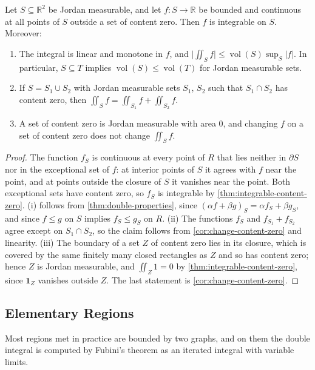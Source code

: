 \begin{theorem}
\label{thm:integral-over-region}
Let $S\subseteq\mathbb R^2$ be Jordan measurable, and let $f\colon S\to\mathbb R$ be bounded and continuous at all points of $S$ outside a set of content zero. Then $f$ is integrable on $S$. Moreover:
\begin{enumerate}
\item The integral is linear and monotone in $f$, and $\bigl|\iint_Sf\bigr|\le\operatorname{vol}(S)\sup_S|f|$. In particular, $S\subseteq T$ implies $\operatorname{vol}(S)\le\operatorname{vol}(T)$ for Jordan measurable sets.
\item If $S=S_1\cup S_2$ with Jordan measurable sets $S_1$, $S_2$ such that $S_1\cap S_2$ has content zero, then $\iint_Sf=\iint_{S_1}f+\iint_{S_2}f$.
\item A set of content zero is Jordan measurable with area $0$, and changing $f$ on a set of content zero does not change $\iint_Sf$.
\end{enumerate}
\end{theorem}

\begin{proof}
The function $f_S$ is continuous at every point of $R$ that lies neither in $\partial S$ nor in the exceptional set of $f$: at interior points of $S$ it agrees with $f$ near the point, and at points outside the closure of $S$ it vanishes near the point. Both exceptional sets have content zero, so $f_S$ is integrable by \cref{thm:integrable-content-zero}. (i) follows from \cref{thm:double-properties}, since $(\alpha f+\beta g)_S=\alpha f_S+\beta g_S$, and since $f\le g$ on $S$ implies $f_S\le g_S$ on $R$. (ii) The functions $f_S$ and $f_{S_1}+f_{S_2}$ agree except on $S_1\cap S_2$, so the claim follows from \cref{cor:change-content-zero} and linearity. (iii) The boundary of a set $Z$ of content zero lies in its closure, which is covered by the same finitely many closed rectangles as $Z$ and so has content zero; hence $Z$ is Jordan measurable, and $\iint_Z1=0$ by \cref{thm:integrable-content-zero}, since $\mathbf 1_Z$ vanishes outside $Z$. The last statement is \cref{cor:change-content-zero}.
\end{proof}

\subsection{Elementary Regions}

Most regions met in practice are bounded by two graphs, and on them the double integral is computed by Fubini's theorem as an iterated integral with variable limits.


